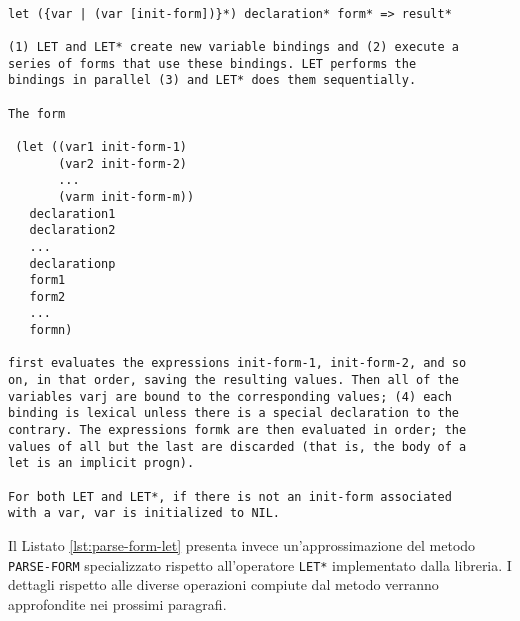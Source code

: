 \begin{lstlisting}[caption=Estratto della documentazione relativa al costrutto
\texttt{LET*}]

let ({var | (var [init-form])}*) declaration* form* => result*

(1) LET and LET* create new variable bindings and (2) execute a
series of forms that use these bindings. LET performs the
bindings in parallel (3) and LET* does them sequentially.

The form

 (let ((var1 init-form-1)
       (var2 init-form-2)
       ...
       (varm init-form-m))
   declaration1
   declaration2
   ...
   declarationp
   form1
   form2
   ...
   formn)

first evaluates the expressions init-form-1, init-form-2, and so
on, in that order, saving the resulting values. Then all of the
variables varj are bound to the corresponding values; (4) each
binding is lexical unless there is a special declaration to the
contrary. The expressions formk are then evaluated in order; the
values of all but the last are discarded (that is, the body of a
let is an implicit progn).

For both LET and LET*, if there is not an init-form associated
with a var, var is initialized to NIL.

\end{lstlisting}

Il Listato \ref{lst:parse-form-let} presenta invece un'approssimazione del
metodo \texttt{PARSE-FORM} specializzato rispetto all'operatore \texttt{LET*}
implementato dalla libreria. I dettagli rispetto alle diverse operazioni
compiute dal metodo verranno approfondite nei prossimi paragrafi.

